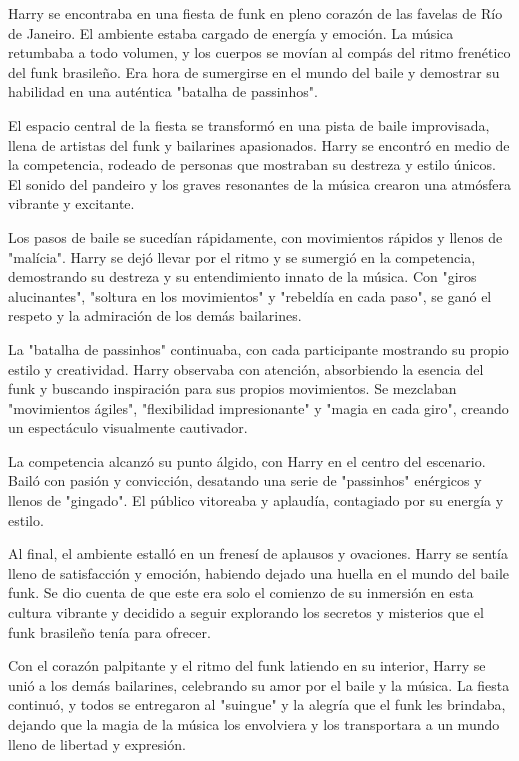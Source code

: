 Harry se encontraba en una fiesta de funk en pleno corazón de las favelas de Río de Janeiro. El ambiente estaba cargado de energía y emoción. La música retumbaba a todo volumen, y los cuerpos se movían al compás del ritmo frenético del funk brasileño. Era hora de sumergirse en el mundo del baile y demostrar su habilidad en una auténtica "batalha de passinhos".

El espacio central de la fiesta se transformó en una pista de baile improvisada, llena de artistas del funk y bailarines apasionados. Harry se encontró en medio de la competencia, rodeado de personas que mostraban su destreza y estilo únicos. El sonido del pandeiro y los graves resonantes de la música crearon una atmósfera vibrante y excitante.

Los pasos de baile se sucedían rápidamente, con movimientos rápidos y llenos de "malícia". Harry se dejó llevar por el ritmo y se sumergió en la competencia, demostrando su destreza y su entendimiento innato de la música. Con "giros alucinantes", "soltura en los movimientos" y "rebeldía en cada paso", se ganó el respeto y la admiración de los demás bailarines.

La "batalha de passinhos" continuaba, con cada participante mostrando su propio estilo y creatividad. Harry observaba con atención, absorbiendo la esencia del funk y buscando inspiración para sus propios movimientos. Se mezclaban "movimientos ágiles", "flexibilidad impresionante" y "magia en cada giro", creando un espectáculo visualmente cautivador.

La competencia alcanzó su punto álgido, con Harry en el centro del escenario. Bailó con pasión y convicción, desatando una serie de "passinhos" enérgicos y llenos de "gingado". El público vitoreaba y aplaudía, contagiado por su energía y estilo.

Al final, el ambiente estalló en un frenesí de aplausos y ovaciones. Harry se sentía lleno de satisfacción y emoción, habiendo dejado una huella en el mundo del baile funk. Se dio cuenta de que este era solo el comienzo de su inmersión en esta cultura vibrante y decidido a seguir explorando los secretos y misterios que el funk brasileño tenía para ofrecer.

Con el corazón palpitante y el ritmo del funk latiendo en su interior, Harry se unió a los demás bailarines, celebrando su amor por el baile y la música. La fiesta continuó, y todos se entregaron al "suingue" y la alegría que el funk les brindaba, dejando que la magia de la música los envolviera y los transportara a un mundo lleno de libertad y expresión.
